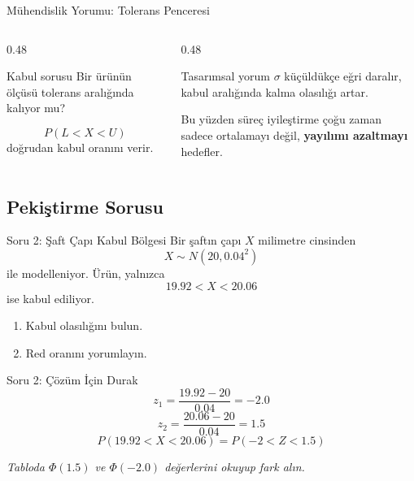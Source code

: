 \documentclass[light]{lutbeamer}
\begin{document}
\begin{frame}{Mühendislik Yorumu: Tolerans Penceresi}
    \small
    \begin{columns}[T]
        \begin{column}{0.48\textwidth}
            \begin{block}{Kabul sorusu}
                Bir ürünün ölçüsü tolerans aralığında kalıyor mu?
            \end{block}
            \[
            P(L<X<U)
            \]
            doğrudan kabul oranını verir.
        \end{column}
        \begin{column}{0.48\textwidth}
            \begin{alertblock}{Tasarımsal yorum}
                \(\sigma\) küçüldükçe eğri daralır, kabul aralığında kalma olasılığı artar.
            \end{alertblock}

            \vspace{0.2cm}
            Bu yüzden süreç iyileştirme çoğu zaman sadece ortalamayı değil,
            \textbf{yayılımı azaltmayı} hedefler.
        \end{column}
    \end{columns}
\end{frame}

\subsection{Pekiştirme Sorusu}

\begin{frame}{Soru 2: Şaft Çapı Kabul Bölgesi}
    \small
    Bir şaftın çapı \(X\) milimetre cinsinden
    \[
    X \sim N(20,0.04^2)
    \]
    ile modelleniyor. Ürün, yalnızca
    \[
    19.92 < X < 20.06
    \]
    ise kabul ediliyor.

    \begin{enumerate}
        \item[(a)] Kabul olasılığını bulun.
        \item[(b)] Red oranını yorumlayın.
    \end{enumerate}
\end{frame}

\begin{frame}{Soru 2: Çözüm İçin Durak}
    \color{red!70!black}
    \small
    \[
    z_1=\frac{19.92-20}{0.04}=-2.0
    \]
    \[
    z_2=\frac{20.06-20}{0.04}=1.5
    \]
    \[
    P(19.92<X<20.06)=P(-2<Z<1.5)
    \]

    \begin{center}
        \textit{Tabloda \(\Phi(1.5)\) ve \(\Phi(-2.0)\) değerlerini okuyup fark alın.}
    \end{center}
\end{frame}
\end{document}
